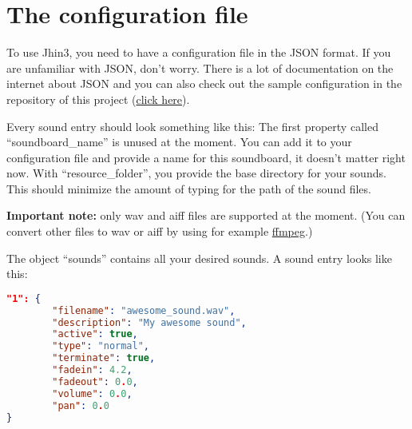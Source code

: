 \section{The configuration file}

To use Jhin3, you need to have a configuration file in the JSON format. If you are unfamiliar with JSON, don't worry. There is a lot of documentation on the internet about JSON and you can also check out the sample configuration in the repository of this project (\href{https://github.com/hannesbraun/jhin3/blob/master/sample_conf.json}{click here}).

Every sound entry should look something like this:
The first property called ``soundboard\_name'' is unused at the moment. You can add it to your configuration file and provide a name for this soundboard, it doesn't matter right now.
With ``resource\_folder'', you provide the base directory for your sounds. This should minimize the amount of typing for the path of the sound files.

\textbf{Important note:} only wav and aiff files are supported at the moment. (You can convert other files to wav or aiff by using for example \href{https://ffmpeg.org}{ffmpeg}.)

The object ``sounds'' contains all your desired sounds. A sound entry looks like this:
\begin{lstlisting}[language=json]
"1": {
        "filename": "awesome_sound.wav",
        "description": "My awesome sound",
        "active": true,
        "type": "normal",
        "terminate": true,
        "fadein": 4.2,
        "fadeout": 0.0,
        "volume": 0.0,
        "pan": 0.0
}
\end{lstlisting}

